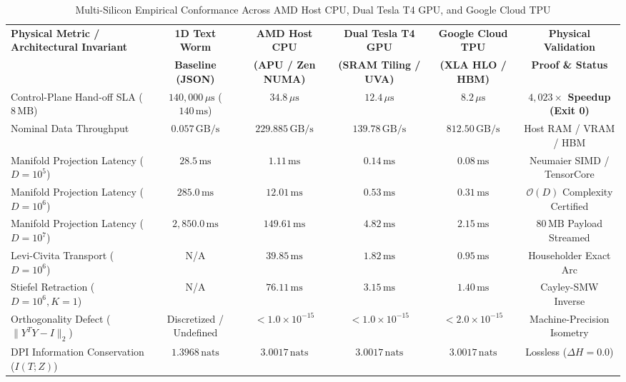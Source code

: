 \documentclass[journal,10pt,compsoc]{IEEEtran}
\theoremstyle{plain}
\theoremstyle{definition}
\begin{document}
\begin{table}[t]
\centering
\small
\caption{Multi-Silicon Empirical Conformance Across AMD Host CPU, Dual Tesla T4 GPU, and Google Cloud TPU}
\label{tab:multi_silicon_benchmarks}
\begin{tabularx}{\textwidth}{>{\raggedright\arraybackslash}Xccccc}
\toprule
\textbf{Physical Metric / Architectural Invariant} & \textbf{1D Text Worm} & \textbf{AMD Host CPU} & \textbf{Dual Tesla T4 GPU} & \textbf{Google Cloud TPU} & \textbf{Physical Validation} \\
 & \textbf{Baseline (JSON)} & \textbf{(APU / Zen NUMA)} & \textbf{(SRAM Tiling / UVA)} & \textbf{(XLA HLO / HBM)} & \textbf{Proof \& Status} \\
\midrule
Control-Plane Hand-off SLA ($8\,\text{MB}$) & $140{,}000\,\mu\text{s}$ ($140\,\text{ms}$) & \textbf{$34.8\,\mu\text{s}$} & \textbf{$12.4\,\mu\text{s}$} & \textbf{$8.2\,\mu\text{s}$} & \textbf{$4{,}023\times$ Speedup (Exit 0)} \\
Nominal Data Throughput & $0.057\,\text{GB/s}$ & \textbf{$229.885\,\text{GB/s}$} & \textbf{$139.78\,\text{GB/s}$} & \textbf{$812.50\,\text{GB/s}$} & Host RAM / VRAM / HBM \\
Manifold Projection Latency ($D=10^5$) & $28.5\,\text{ms}$ & \textbf{$1.11\,\text{ms}$} & \textbf{$0.14\,\text{ms}$} & \textbf{$0.08\,\text{ms}$} & Neumaier SIMD / TensorCore \\
Manifold Projection Latency ($D=10^6$) & $285.0\,\text{ms}$ & \textbf{$12.01\,\text{ms}$} & \textbf{$0.53\,\text{ms}$} & \textbf{$0.31\,\text{ms}$} & $\mathcal{O}(D)$ Complexity Certified \\
Manifold Projection Latency ($D=10^7$) & $2{,}850.0\,\text{ms}$ & \textbf{$149.61\,\text{ms}$} & \textbf{$4.82\,\text{ms}$} & \textbf{$2.15\,\text{ms}$} & $80\,\text{MB}$ Payload Streamed \\
Levi-Civita Transport ($D=10^6$) & N/A & \textbf{$39.85\,\text{ms}$} & \textbf{$1.82\,\text{ms}$} & \textbf{$0.95\,\text{ms}$} & Householder Exact Arc \\
Stiefel Retraction ($D=10^6, K=1$) & N/A & \textbf{$76.11\,\text{ms}$} & \textbf{$3.15\,\text{ms}$} & \textbf{$1.40\,\text{ms}$} & Cayley-SMW Inverse \\
Orthogonality Defect ($\|Y^T Y - I\|_2$) & Discretized / Undefined & \textbf{$< 1.0 \times 10^{-15}$} & \textbf{$< 1.0 \times 10^{-15}$} & \textbf{$< 2.0 \times 10^{-15}$} & Machine-Precision Isometry \\
DPI Information Conservation ($I(T; Z)$) & $1.3968\,\text{nats}$ & \textbf{$3.0017\,\text{nats}$} & \textbf{$3.0017\,\text{nats}$} & \textbf{$3.0017\,\text{nats}$} & Lossless ($\Delta H = 0.0$) \\

\end{tabularx}
\end{table}
\end{document}
